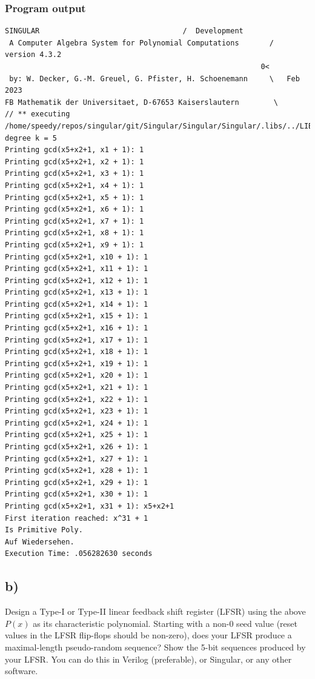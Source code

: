 \documentclass[a4paper,11pt]{exam}
\begin{document}
\subsubsection{Program output}
\label{sec:org55dc8f2}
\begin{lstlisting}[language=sing]
                     SINGULAR                                 /  Development
 A Computer Algebra System for Polynomial Computations       /   version 4.3.2
                                                           0<
 by: W. Decker, G.-M. Greuel, G. Pfister, H. Schoenemann     \   Feb 2023
FB Mathematik der Universitaet, D-67653 Kaiserslautern        \
// ** executing /home/speedy/repos/singular/git/Singular/Singular/Singular/.libs/../LIB/.singularrc
degree k = 5
Printing gcd(x5+x2+1, x1 + 1): 1
Printing gcd(x5+x2+1, x2 + 1): 1
Printing gcd(x5+x2+1, x3 + 1): 1
Printing gcd(x5+x2+1, x4 + 1): 1
Printing gcd(x5+x2+1, x5 + 1): 1
Printing gcd(x5+x2+1, x6 + 1): 1
Printing gcd(x5+x2+1, x7 + 1): 1
Printing gcd(x5+x2+1, x8 + 1): 1
Printing gcd(x5+x2+1, x9 + 1): 1
Printing gcd(x5+x2+1, x10 + 1): 1
Printing gcd(x5+x2+1, x11 + 1): 1
Printing gcd(x5+x2+1, x12 + 1): 1
Printing gcd(x5+x2+1, x13 + 1): 1
Printing gcd(x5+x2+1, x14 + 1): 1
Printing gcd(x5+x2+1, x15 + 1): 1
Printing gcd(x5+x2+1, x16 + 1): 1
Printing gcd(x5+x2+1, x17 + 1): 1
Printing gcd(x5+x2+1, x18 + 1): 1
Printing gcd(x5+x2+1, x19 + 1): 1
Printing gcd(x5+x2+1, x20 + 1): 1
Printing gcd(x5+x2+1, x21 + 1): 1
Printing gcd(x5+x2+1, x22 + 1): 1
Printing gcd(x5+x2+1, x23 + 1): 1
Printing gcd(x5+x2+1, x24 + 1): 1
Printing gcd(x5+x2+1, x25 + 1): 1
Printing gcd(x5+x2+1, x26 + 1): 1
Printing gcd(x5+x2+1, x27 + 1): 1
Printing gcd(x5+x2+1, x28 + 1): 1
Printing gcd(x5+x2+1, x29 + 1): 1
Printing gcd(x5+x2+1, x30 + 1): 1
Printing gcd(x5+x2+1, x31 + 1): x5+x2+1
First iteration reached: x^31 + 1
Is Primitive Poly.
Auf Wiedersehen.
Execution Time: .056282630 seconds
\end{lstlisting}

\subsection{b)}
\label{sec:orgcfcdd02}
Design a Type-I or Type-II linear feedback shift register (LFSR) using the above $P(x)$ as its characteristic polynomial. Starting with a non-0 seed value (reset values in the LFSR flip-flops should be non-zero), does your LFSR produce a maximal-length pseudo-random sequence? Show the 5-bit sequences produced by your LFSR. You can do this in Verilog (preferable), or Singular, or any other software.
\newpage
\end{document}
